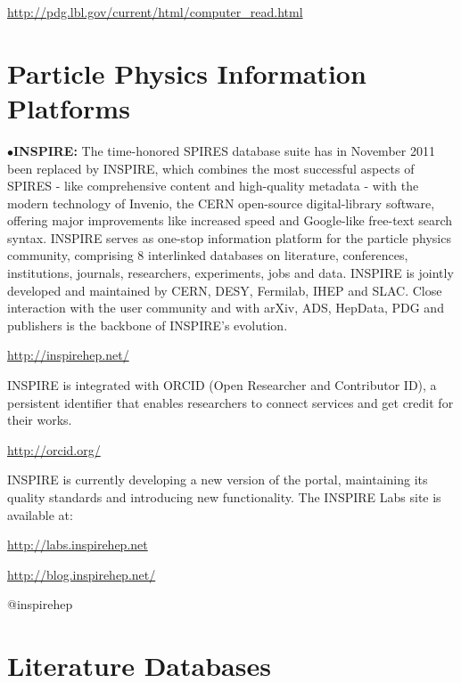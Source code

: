           \item{}\quad\url{http://pdg.lbl.gov/current/html/computer\_read.html}
\medskip


\section{Particle Physics Information Platforms}%


\item{$\bullet$}{\bf INSPIRE:}
The time-honored SPIRES database suite has in November 2011 been replaced by INSPIRE, which combines the most successful aspects of SPIRES - like comprehensive content and high-quality metadata - with the modern technology of Invenio, the CERN open-source digital-library software, offering major improvements like increased speed and Google-like free-text search syntax. INSPIRE serves as one-stop information platform for the particle physics community, comprising 8 interlinked databases on literature, conferences, institutions, journals, researchers, experiments, jobs and data. INSPIRE is jointly developed and maintained by CERN, DESY, Fermilab, IHEP and SLAC. Close interaction with the user community and with arXiv, ADS, HepData, PDG and publishers is the backbone of INSPIRE's evolution. 
	\item{}\qquad\url{http://inspirehep.net/}

\item{}INSPIRE is integrated with ORCID (Open Researcher and Contributor ID), a persistent identifier that enables researchers to connect services and get credit for their works.
	\item{}\qquad\url{http://orcid.org/}

\item{}INSPIRE is currently developing a new version of the portal, maintaining its quality standards and introducing new functionality. The INSPIRE Labs site is available at:

	\item{}\qquad\url{http://labs.inspirehep.net}
	\item{} \url{http://blog.inspirehep.net/}
	\item{} @inspirehep


\medskip

\section{Literature Databases}%


